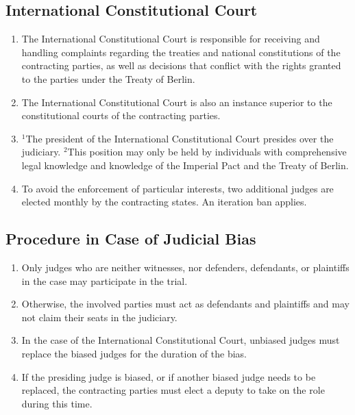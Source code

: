 \documentclass{article}
\begin{document}
\subsection{International Constitutional Court}
\begin{enumerate}[(1)]
    \item The International Constitutional Court is responsible for receiving and handling complaints regarding the treaties and national constitutions of the contracting parties, as well as decisions that conflict with the rights granted to the parties under the Treaty of Berlin.
    \item The International Constitutional Court is also an instance superior to the constitutional courts of the contracting parties.
    \item ${^1}$The president of the International Constitutional Court presides over the judiciary. ${^2}$This position may only be held by individuals with comprehensive legal knowledge and knowledge of the Imperial Pact and the Treaty of Berlin.
    \item To avoid the enforcement of particular interests, two additional judges are elected monthly by the contracting states. An iteration ban applies.
\end{enumerate}

\subsection{Procedure in Case of Judicial Bias}
\begin{enumerate}[(1)]
    \item Only judges who are neither witnesses, nor defenders, defendants, or plaintiffs in the case may participate in the trial.
    \item Otherwise, the involved parties must act as defendants and plaintiffs and may not claim their seats in the judiciary.
    \item In the case of the International Constitutional Court, unbiased judges must replace the biased judges for the duration of the bias.
    \item If the presiding judge is biased, or if another biased judge needs to be replaced, the contracting parties must elect a deputy to take on the role during this time.
\end{enumerate}
\end{document}
